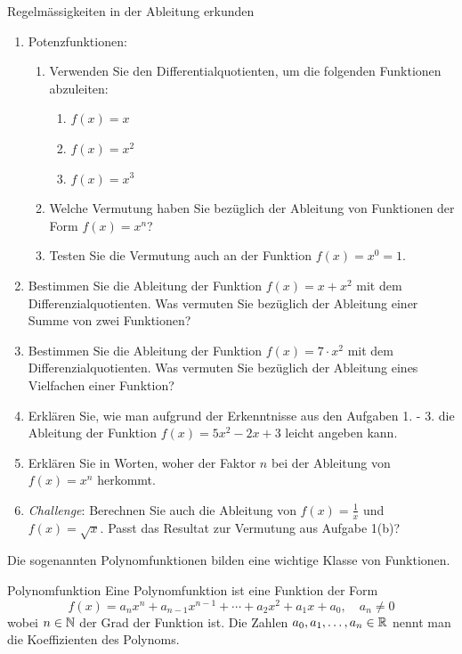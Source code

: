 
\begin{LA} {Regelmässigkeiten in der Ableitung erkunden}{}
	\begin{enumerate}
		\item Potenzfunktionen:
		      \begin{enumerate}
			      \item Verwenden Sie den Differentialquotienten, um die folgenden Funktionen abzuleiten:
			            \begin{enumerate}
				            \item $f(x)=x$
				            \item $f(x)=x^2$
				            \item $f(x)=x^3$
			            \end{enumerate}
			      \item Welche Vermutung haben Sie bezüglich der Ableitung von Funktionen der Form $f(x)=x^n$?
			      \item Testen Sie die Vermutung auch an der Funktion $f(x)=x^0=1$.
		      \end{enumerate}
		\item  Bestimmen Sie die Ableitung der Funktion $f(x)=x+x^2$ mit dem Differenzialquotienten. Was vermuten Sie bezüglich der Ableitung einer Summe von zwei Funktionen?
		\item Bestimmen Sie die Ableitung der Funktion $f(x)=7\cdot x^2$ mit dem Differenzialquotienten. Was vermuten Sie bezüglich der Ableitung eines Vielfachen einer Funktion?
		\item  Erklären Sie, wie man aufgrund der Erkenntnisse aus den Aufgaben 1. - 3. die Ableitung der Funktion $f(x)=5x^2-2x+3$ leicht angeben kann.
		\item Erklären Sie in Worten, woher der Faktor $n$ bei der Ableitung von $f(x)=x^n$ herkommt.
		\item \emph{Challenge}: Berechnen Sie auch die Ableitung von $f(x)=\frac{1}{x}$ und $f(x)=\sqrt{x}$. Passt das Resultat zur Vermutung aus Aufgabe 1(b)?
	\end{enumerate}
\end{LA}
\clearpage
Die sogenannten Polynomfunktionen bilden eine wichtige Klasse von Funktionen.
\begin{definition}
	{Polynomfunktion}{}
	Eine Polynomfunktion ist eine Funktion der Form
	$$f(x)=a_n x^n+a_{n-1} x^{n-1}+\cdots + a_2 x^2+a_1 x+a_0,\quad a_n\neq0$$
	wobei $n\in \mathbb{N}$ der Grad der Funktion ist.
	Die Zahlen $a_0,a_1,\ldots ,a_n \in \mathbb{R}$ nennt man die Koeffizienten des Polynoms.
\end{definition}

